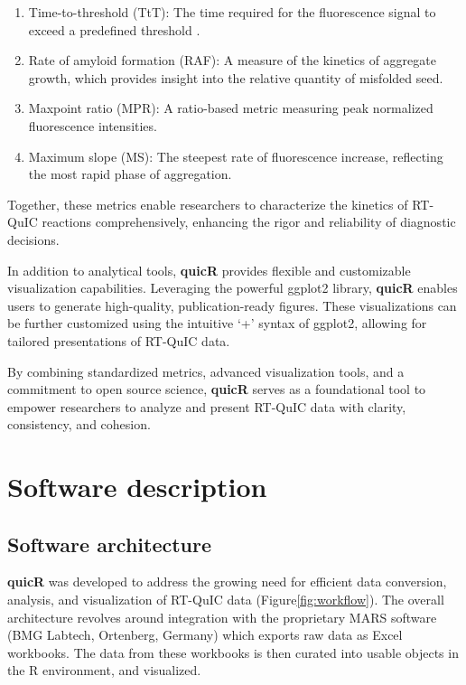 \documentclass[preprint,12pt,a4paper]{elsarticle}
\providecommand{\DIFaddtex}[1]{{\protect\color{blue}\uwave{#1}}} %
\providecommand{\DIFaddbegin}{} %
\providecommand{\DIFaddend}{} %
\providecommand{\DIFadd}[1]{\texorpdfstring{\DIFaddtex{#1}}{#1}} %
\begin{document}
        \begin{enumerate}
            \item Time-to-threshold (TtT): The time required for the fluorescence signal to exceed a predefined threshold \DIFaddbegin \DIFadd{(also known as lag time)~}\DIFaddend \cite{Orru2015}. 
            \item Rate of amyloid formation (RAF): A measure of the kinetics of aggregate growth, which provides insight into the relative quantity of misfolded seed\DIFaddbegin \DIFadd{~}\DIFaddend \cite{Gallups2022}.
            \item Maxpoint ratio (MPR): A ratio-based metric measuring peak normalized fluorescence intensities\DIFaddbegin \DIFadd{~}\DIFaddend \cite{Rowden2023}.
            \item Maximum slope (MS): The steepest rate of fluorescence increase, reflecting the most rapid phase of aggregation\DIFaddbegin \DIFadd{~}\DIFaddend \cite{Henderson2015}.
        \end{enumerate}

        Together, these metrics enable researchers to characterize the kinetics of RT-QuIC reactions comprehensively, enhancing the rigor and reliability of diagnostic decisions.

        In addition to analytical tools, \textbf{quicR} provides flexible and customizable visualization capabilities. Leveraging the powerful ggplot2 library\DIFaddbegin \DIFadd{~}\DIFaddend \cite{ggplot2016}, \textbf{quicR} enables users to generate high-quality, publication-ready figures. These visualizations can be further customized using the intuitive `+' syntax of ggplot2, allowing for tailored presentations of RT-QuIC data.

        By combining standardized metrics, advanced visualization tools, and a commitment to open source science, \textbf{quicR} serves as a foundational tool to empower researchers to analyze and present RT-QuIC data with clarity, consistency, and cohesion.

    \section{Software description}
        \subsection{Software architecture}
            \textbf{quicR} was developed to address the growing need for efficient data conversion, analysis, and visualization of RT-QuIC data (Figure\DIFaddbegin \DIFadd{~}\DIFaddend \ref{fig:workflow}). The overall architecture revolves around integration with the proprietary MARS software (BMG Labtech, Ortenberg, Germany) which exports raw data as Excel workbooks. The data from these workbooks is then curated into usable objects in the R environment, and visualized.
\end{document}
